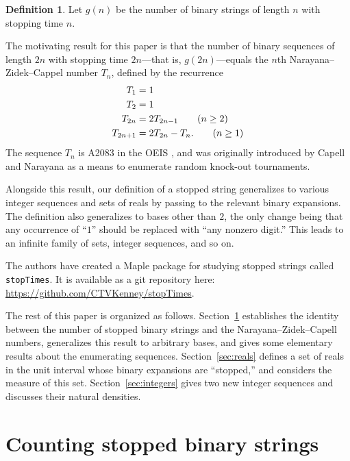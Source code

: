 \documentclass[12pt]{article}
\theoremstyle{definition}
\newtheorem{definition}{Definition}
\begin{document}
\begin{definition}
    Let $g(n)$ be the number of binary strings of length $n$ with stopping time
    $n$. 
\end{definition}

The motivating result for this paper is that the number of binary sequences of
length $2n$ with stopping time $2n$---that is, $g(2n)$---equals the $n$th
Narayana--Zidek--Cappel number $T_n$, defined by the recurrence
\begin{align}
    T_1 &= 1 \notag \\
    T_2 &= 1 \notag \\
    T_{2n} &= 2 T_{2n - 1} \tag{$n \geq 2$} \\
    T_{2n + 1} &= 2 T_{2n} - T_n. \tag{$n \geq 1$}
\end{align}
The sequence $T_n$ is A2083 in the OEIS \cite{oeis}, and was originally
introduced by Capell and Narayana \cite{capell1970knock,
narayana1969tournaments, narayana1979tournaments} as a means to enumerate
random knock-out tournaments.

Alongside this result, our definition of a stopped string generalizes to
various integer sequences and sets of reals by passing to the relevant binary
expansions. The definition also generalizes to bases other than $2$, the only
change being that any occurrence of ``$1$'' should be replaced with ``any
nonzero digit.'' This leads to an infinite family of sets, integer sequences,
and so on.

The authors have created a Maple package for studying stopped strings called
\texttt{stopTimes}. It is available as a git repository here:
\url{https://github.com/CTVKenney/stopTimes}.

The rest of this paper is organized as follows. Section~\ref{sec:recs}
establishes the identity between the number of stopped binary strings and the
Narayana--Zidek--Capell numbers, generalizes this result to arbitrary bases,
and gives some elementary results about the enumerating sequences.
Section~\ref{sec:reals} defines a set of reals in the unit interval whose
binary expansions are ``stopped,'' and considers the measure of this set.
Section~\ref{sec:integers} gives two new integer sequences and discusses their
natural densities.

\section{Counting stopped binary strings}
\label{sec:recs}
\end{document}
